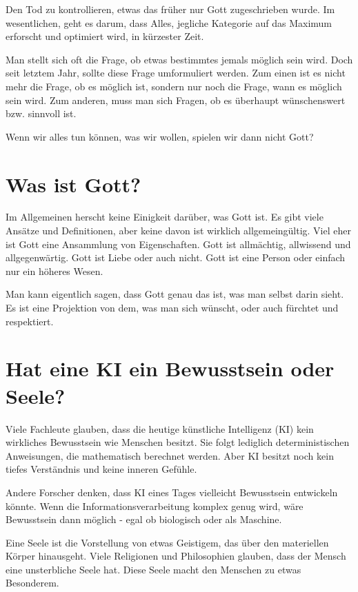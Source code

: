 \documentclass[10pt]{article}
\begin{document}
Den Tod zu kontrollieren, etwas das früher nur Gott zugeschrieben wurde.
Im wesentlichen, geht es darum, dass Alles, jegliche Kategorie auf das Maximum erforscht und optimiert wird, in kürzester Zeit.

\cite{Kurzweil}

Man stellt sich oft die Frage, ob etwas bestimmtes jemals möglich sein wird.
Doch seit letztem Jahr, sollte diese Frage umformuliert werden.
Zum einen ist es nicht mehr die Frage, ob es möglich ist, sondern nur noch die Frage, wann es möglich sein wird.
Zum anderen, muss man sich Fragen, ob es überhaupt wünschenswert bzw. sinnvoll ist.

Wenn wir alles tun können, was wir wollen, spielen wir dann nicht Gott?

\newpage
\section{Was ist Gott?}
Im Allgemeinen herscht keine Einigkeit darüber, was Gott ist.
Es gibt viele Ansätze und Definitionen, aber keine davon ist wirklich allgemeingültig.
Viel eher ist Gott eine Ansammlung von Eigenschaften.
Gott ist allmächtig, allwissend und allgegenwärtig.
Gott ist Liebe oder auch nicht.
Gott ist eine Person oder einfach nur ein höheres Wesen.


Man kann eigentlich sagen, dass Gott genau das ist, was man selbst darin sieht.
Es ist eine Projektion von dem, was man sich wünscht, oder auch fürchtet und respektiert.

\cite{gottkennen}
\cite{Jesushaus}
\section{Hat eine KI ein Bewusstsein oder Seele?}

Viele Fachleute glauben, dass die heutige künstliche Intelligenz (KI) kein wirkliches Bewusstsein wie Menschen besitzt. Sie folgt lediglich deterministischen Anweisungen, die mathematisch berechnet werden. Aber KI besitzt noch kein tiefes Verständnis und keine inneren Gefühle.

Andere Forscher denken, dass KI eines Tages vielleicht Bewusstsein entwickeln könnte. Wenn die Informationsverarbeitung komplex genug wird, wäre Bewusstsein dann möglich - egal ob biologisch oder als Maschine.

Eine Seele ist die Vorstellung von etwas Geistigem, das über den materiellen Körper hinausgeht. Viele Religionen und Philosophien glauben, dass der Mensch eine unsterbliche Seele hat. Diese Seele macht den Menschen zu etwas Besonderem.
\end{document}
